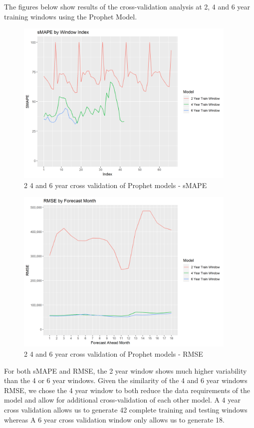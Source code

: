 \documentclass[12pt,oneside]{chicagocapstone}
\begin{document}
The figures below show results of the cross-validation analysis at 2, 4
and 6 year training windows using the Prophet Model.
\begin{figure}

{\centering \includegraphics[width=400px]{figure/Prophet_SMAPE_CV} 

}

\caption{2 4 and 6 year cross validation of Prophet models - sMAPE}\label{fig:cross-val-selection-smape}
\end{figure}
\begin{figure}

{\centering \includegraphics[width=400px]{figure/Prophet_RMSE_CV} 

}

\caption{2 4 and 6 year cross validation of Prophet models - RMSE}\label{fig:cross-val-selection-rmse}
\end{figure}
For both sMAPE and RMSE, the 2 year window shows much higher variability
than the 4 or 6 year windows. Given the similarity of the 4 and 6 year
windows RMSE, we chose the 4 year window to both reduce the data
requirements of the model and allow for additional cross-validation of
each other model. A 4 year cross validation allows us to generate 42
complete training and testing windows whereas A 6 year cross validation
window only allows us to generate 18.
\end{document}
